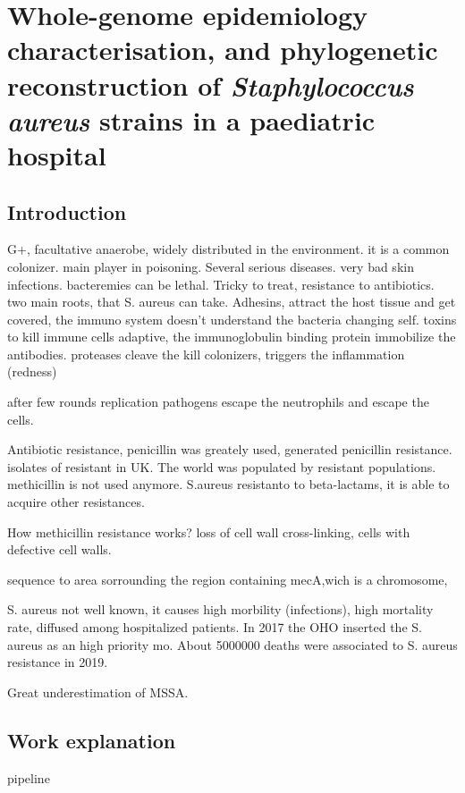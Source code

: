 
\chapter{Whole-genome epidemiology characterisation, and phylogenetic reconstruction of \textit{Staphylococcus aureus} strains in a paediatric hospital}

\section{Introduction}
G+, facultative anaerobe, widely distributed in the environment. it is a common colonizer. main player in poisoning. Several serious diseases.  very bad skin infections. bacteremies can be lethal. 
Tricky to treat, resistance to antibiotics. two main roots, that S. aureus can take. Adhesins, attract the host tissue and get covered, the immuno system doesn't understand the bacteria changing self. toxins to kill immune cells adaptive, the immunoglobulin binding protein immobilize the antibodies. proteases cleave the 
kill colonizers,  triggers the inflammation (redness)

after few rounds replication pathogens escape the neutrophils and escape the cells. 

Antibiotic resistance, penicillin was greately used, generated penicillin resistance. 
isolates of resistant in UK. The world was populated by resistant populations. methicillin is not used anymore. 
S.aureus resistanto to beta-lactams, it is able to acquire other resistances. 

How methicillin resistance works?
loss of cell wall cross-linking, cells with defective cell walls. 

sequence to area sorrounding the region containing mecA,wich is a chromosome,

S. aureus not well known, it causes high morbility (infections), high mortality rate, diffused among hospitalized patients. In 2017 the OHO inserted the S. aureus as an high priority mo. About 5000000 deaths were associated to S. aureus resistance in 2019.

Great underestimation of MSSA. 


\section{Work explanation}
pipeline

